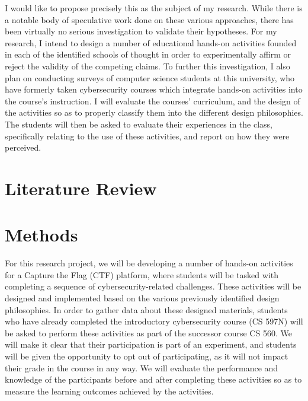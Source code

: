 \documentclass{article}
\begin{document}
        I would like to propose precisely this as the subject of my research. %
While there is a notable body of speculative work done on these various approaches, there has been virtually no serious investigation to validate their hypotheses. %
For my research, I intend to design a number of educational hands-on activities founded in each of the identified schools of thought in order to experimentally affirm or reject the validity of the competing claims. %
To further this investigation, I also plan on conducting surveys of computer science students at this university, who have formerly taken cybersecurity courses which integrate hands-on activities into the course's instruction. %
I will evaluate the courses' curriculum, and the design of the activities so as to properly classify them into the different design philosophies. %
The students will then be asked to evaluate their experiences in the class, specifically relating to the use of these activities, and report on how they were perceived. 

\section{Literature Review}

        

\section{Methods}

    For this research project, we will be developing a number of hands-on activities for a Capture the Flag (CTF) platform, where students will be tasked with completing a sequence of cybersecurity-related challenges. %
These activities will be designed and implemented based on the various previously identified design philosophies. %
In order to gather data about these designed materials, students who have already completed the introductory cybersecurity course (CS 597N) will be asked to perform these activities as part of the successor course CS 560. %
We will make it clear that their participation is part of an experiment, and students will be given the opportunity to opt out of participating, as it will not impact their grade in the course in any way. %
We will evaluate the performance and knowledge of the participants before and after completing these activities so as to measure the learning outcomes achieved by the activities. 
\end{document}
